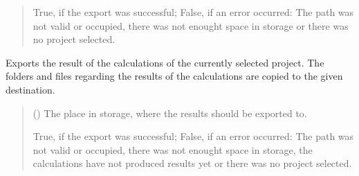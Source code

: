 \documentclass[letterpaper,10pt,english]{sphinxmanual}
\begin{document}
\begin{fulllineitems}
\begin{fulllineitems}
\begin{quote}
\begin{description}
\sphinxAtStartPar
True, if the export was successful; False, if an error occurred: The path was not valid or occupied, there was not enought space in storage or there was no project selected.

\sphinxAtStartPar
{}

\end{description}\end{quote}

\end{fulllineitems}


\begin{fulllineitems}
\label{\detokenize{apidoc/src.osm_configurator.control:src.osm_configurator.control.export_controller.ExportController.export_calculations}}
\pysigstartsignatures
{}
\pysigstopsignatures
\sphinxAtStartPar
Exports the result of the calculations of the currently selected project.
The folders and files regarding the results of the calculations are copied to the given destination.
\begin{quote}\begin{description}
\sphinxAtStartPar
{} () \textendash{} The place in storage, where the results should be exported to.

\sphinxAtStartPar
True, if the export was successful; False, if an error occurred: The path was not valid or occupied, there was not enought space in storage, the calculations have not produced results yet or there was no project selected.

\sphinxAtStartPar
{}

\end{description}\end{quote}

\end{fulllineitems}



\end{fulllineitems}
\end{document}

